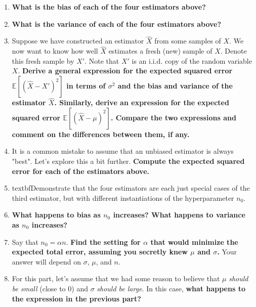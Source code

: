 \documentclass{article}\usepackage[utf8]{inputenc}\usepackage[margin=0.4cm,top=0.4cm,bottom=0.4cm]{geometry}\usepackage[usenames,dvipsnames,svgnames,table]{xcolor}
\begin{document}
\begin{enumerate}
\item \textbf{What is the bias of each of the four estimators above?}
\BeginSolution

\EndSolution
\item \textbf{What is the variance of each of the four estimators above?}
\BeginSolution

\EndSolution
\item Suppose we have constructed an estimator $\hat X$ from some samples of $X$. We now want to know how well $\hat X$ estimates a fresh (new) sample of $X$. Denote this fresh sample by $X'$. Note that $X'$ is an i.i.d. copy of the random variable $X$. \textbf{Derive a general expression for the expected squared error $\mathbb{E}[(\hat{X} - X')^2] $ in terms of $\sigma^2$ and the bias and variance of the estimator $\hat X$. Similarly, derive an expression for the expected squared error $\mathbb{E}[(\hat{X} - \mu)^2]$. Compare the two expressions and comment on the differences between them, if any.}
\BeginSolution

\EndSolution
\item It is a common mistake to assume that an unbiased estimator is always "best". Let's explore this a bit further. \textbf{Compute the expected squared error for each of the estimators above.}
\BeginSolution

\EndSolution
\item textbf{Demonstrate that the four estimators are each just special cases of the third estimator, but with different instantiations of the hyperparameter $n_0$}.
\BeginSolution

\EndSolution
\item \textbf{What happens to bias as $n_0$ increases? What happens to variance as $n_0$ increases?}
\BeginSolution

\EndSolution
\item Say that $n_0 = \alpha n$. \textbf{Find the setting for $\alpha$ that would minimize the expected total error, assuming you secretly knew $\mu$ and $\sigma$.} Your answer will depend on $\sigma$, $\mu$, and $n$.
\BeginSolution

\EndSolution
\item For this part, let's assume that we had some reason to believe that $\mu$ \emph{should be small} (close to $0$) and $\sigma$ \emph{should be large}. In this case, \textbf{what happens to the expression in the previous part?}
\BeginSolution


\end{enumerate}
\end{document}
